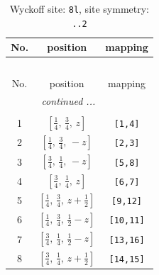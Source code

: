 \documentclass[fleqn,8pt]{jsarticle}
\begin{document}
\begin{longtable}{ccc}
\caption{Wyckoff site: {\tt 8l}, site symmetry: {\tt ..2}}
 \\
 \hline \hline
No. & position & mapping \\ \hline \endfirsthead

\multicolumn{2}{l}{\tablename\ \thetable{}} \\
 \hline \hline
No. & position & mapping \\ \hline \endhead

 \hline \hline
\multicolumn{2}{r}{\footnotesize\it continued ...} \\ \endfoot

 \hline \hline
\multicolumn{2}{r}{} \\ \endlastfoot

1 & $\left[ \frac{1}{4},\, \frac{3}{4},\, z \right]$ & {\tt [1,4]} \\ \hline
2 & $\left[ \frac{1}{4},\, \frac{3}{4},\, - z \right]$ & {\tt [2,3]} \\ \hline
3 & $\left[ \frac{3}{4},\, \frac{1}{4},\, - z \right]$ & {\tt [5,8]} \\ \hline
4 & $\left[ \frac{3}{4},\, \frac{1}{4},\, z \right]$ & {\tt [6,7]} \\ \hline
5 & $\left[ \frac{1}{4},\, \frac{3}{4},\, z + \frac{1}{2} \right]$ & {\tt [9,12]} \\ \hline
6 & $\left[ \frac{1}{4},\, \frac{3}{4},\, \frac{1}{2} - z \right]$ & {\tt [10,11]} \\ \hline
7 & $\left[ \frac{3}{4},\, \frac{1}{4},\, \frac{1}{2} - z \right]$ & {\tt [13,16]} \\ \hline
8 & $\left[ \frac{3}{4},\, \frac{1}{4},\, z + \frac{1}{2} \right]$ & {\tt [14,15]} \\
\end{longtable}
\renewcommand{\arraystretch}{1.2}
\end{document}
